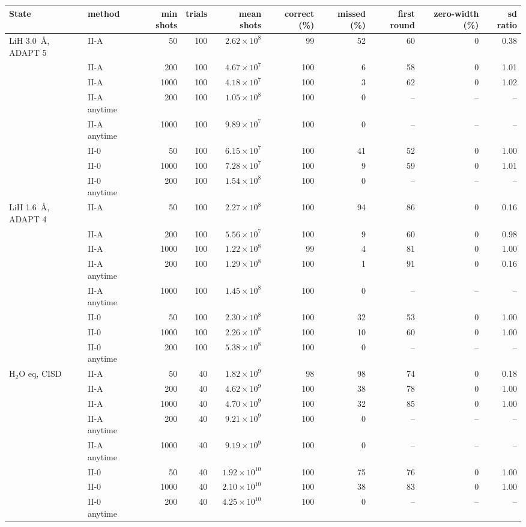 \begin{tabular}{@{}llrrrrrrrr@{}}
\toprule
State & method & min shots & trials & mean shots & correct (\%) & missed (\%) & first round & zero-width (\%) & sd ratio \\
\midrule
LiH 3.0~\AA, ADAPT 5 & II-A & 50 & 100 & $2.62\times10^{8}$ & 99 & 52 & 60 & 0 & 0.38 \\
 & II-A & 200 & 100 & $4.67\times10^{7}$ & 100 & 6 & 58 & 0 & 1.01 \\
 & II-A & 1000 & 100 & $4.18\times10^{7}$ & 100 & 3 & 62 & 0 & 1.02 \\
 & II-A anytime & 200 & 100 & $1.05\times10^{8}$ & 100 & 0 & -- & -- & -- \\
 & II-A anytime & 1000 & 100 & $9.89\times10^{7}$ & 100 & 0 & -- & -- & -- \\
 & II-0 & 50 & 100 & $6.15\times10^{7}$ & 100 & 41 & 52 & 0 & 1.00 \\
 & II-0 & 1000 & 100 & $7.28\times10^{7}$ & 100 & 9 & 59 & 0 & 1.01 \\
 & II-0 anytime & 200 & 100 & $1.54\times10^{8}$ & 100 & 0 & -- & -- & -- \\
\midrule
LiH 1.6~\AA, ADAPT 4 & II-A & 50 & 100 & $2.27\times10^{8}$ & 100 & 94 & 86 & 0 & 0.16 \\
 & II-A & 200 & 100 & $5.56\times10^{7}$ & 100 & 9 & 60 & 0 & 0.98 \\
 & II-A & 1000 & 100 & $1.22\times10^{8}$ & 99 & 4 & 81 & 0 & 1.00 \\
 & II-A anytime & 200 & 100 & $1.29\times10^{8}$ & 100 & 1 & 91 & 0 & 0.16 \\
 & II-A anytime & 1000 & 100 & $1.45\times10^{8}$ & 100 & 0 & -- & -- & -- \\
 & II-0 & 50 & 100 & $2.30\times10^{8}$ & 100 & 32 & 53 & 0 & 1.00 \\
 & II-0 & 1000 & 100 & $2.26\times10^{8}$ & 100 & 10 & 60 & 0 & 1.00 \\
 & II-0 anytime & 200 & 100 & $5.38\times10^{8}$ & 100 & 0 & -- & -- & -- \\
\midrule
H$_2$O eq, CISD & II-A & 50 & 40 & $1.82\times10^{9}$ & 98 & 98 & 74 & 0 & 0.18 \\
 & II-A & 200 & 40 & $4.62\times10^{9}$ & 100 & 38 & 78 & 0 & 1.00 \\
 & II-A & 1000 & 40 & $4.70\times10^{9}$ & 100 & 32 & 85 & 0 & 1.00 \\
 & II-A anytime & 200 & 40 & $9.21\times10^{9}$ & 100 & 0 & -- & -- & -- \\
 & II-A anytime & 1000 & 40 & $9.19\times10^{9}$ & 100 & 0 & -- & -- & -- \\
 & II-0 & 50 & 40 & $1.92\times10^{10}$ & 100 & 75 & 76 & 0 & 1.00 \\
 & II-0 & 1000 & 40 & $2.10\times10^{10}$ & 100 & 38 & 83 & 0 & 1.00 \\
 & II-0 anytime & 200 & 40 & $4.25\times10^{10}$ & 100 & 0 & -- & -- & -- \\
\bottomrule
\end{tabular}
